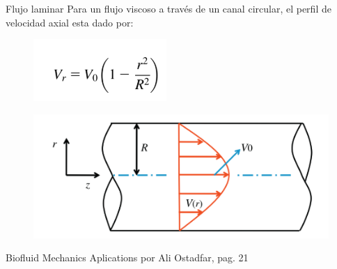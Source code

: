 \begin{frame}{Flujo laminar}
\justifying
Para un flujo viscoso a través de un canal circular, el perfil de velocidad axial esta dado por:
\begin{figure}[H]
\centering
\includegraphics[scale=0.4]{Section_Files/S2-imagenes-Manuel/04.png}
\end{figure}
\begin{figure}[H]
\centering
\includegraphics[scale=0.3]{Section_Files/S2-imagenes-Manuel/05.png}
\end{figure}
{\tiny Biofluid Mechanics Aplications por Ali Ostadfar, pag. 21}
\end{frame}

